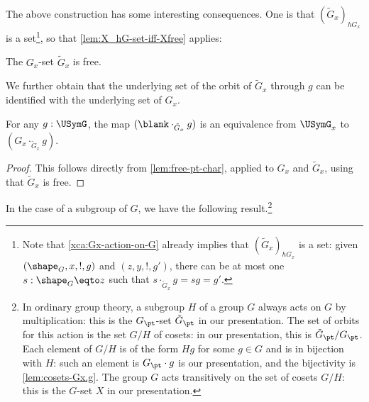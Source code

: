 The above construction has some interesting consequences.  One is that
$(\tilde G_x)_{hG_x}$ is a set\footnote{\label{ft:action-type-tildeGx-set} Note
  that \cref{xca:Gx-action-on-G} already implies that $(\tilde G_x)_{hG_x}$ is a
  set: given $(\sh_G,x,!,g)$ and $(z,y,!,g')$, there can be at most one
  $s : \sh_G \eqto z$ such that $s\cdot_{\tilde G_x} g = sg = g'$.}, so that
\cref{lem:X_hG-set-iff-Xfree} applies:

\begin{corollary}\label{cor:action-subgrp-free}
The $G_x$-set $\tilde G_x$ is free.
\end{corollary}

We further obtain that the underlying set of the orbit of $\tilde G_x$ through $g$ can be
identified with the underlying set of $G_x$.

\begin{corollary}\label{lem:cosets-Gx.g}
  For any $g:\USymG$, the map $(\blank \cdot_{\tilde G_x} g)$ is
  an equivalence from $\USymG_x$ to $(G_x \cdot_{\tilde G_x} g)$.
\end{corollary} 
 
\begin{proof}
This follows directly from \cref{lem:free-pt-char}, 
applied to $G_x$ and $\tilde G_x$, using that $\tilde G_x$ is free.
\end{proof}

In the case of a subgroup of $G$, we have the following result.\footnote{In
    ordinary group theory, a subgroup $H$ of a group $G$ always acts on $G$ by
    multiplication: this is the $G_{\pt}$-set $\tilde G_{\pt}$ in our
    presentation. The set of orbits for this action is the set $G/H$ of cosets:
    in our presentation, this is $\tilde G_{\pt} /G_{\pt}$. Each element of
    $G/H$ is of the form $Hg$ for some $g\in G$ and is in bijection with $H$:
    such an element is $G_{\pt} \cdot g$ is our presentation, and the
    bijectivity is \cref{lem:cosets-Gx.g}. The group $G$ acts transitively on
    the set of cosets $G/H$: this is the $G$-set $X$ in our presentation.}

